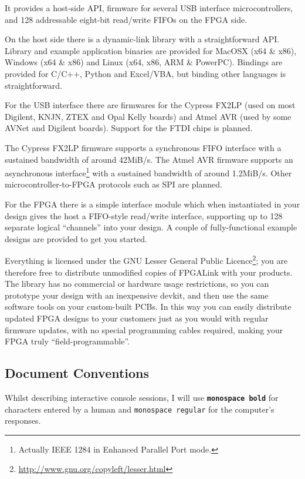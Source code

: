 It provides a host-side API, firmware for several USB interface microcontrollers, and 128 addressable eight-bit read/write FIFOs on the FPGA side.

\begin{blobs}
  \item
    On the host side there is a dynamic-link library with a straightforward API. Library and example application binaries are provided for MacOSX (x64 \& x86), Windows (x64 \& x86) and Linux (x64, x86, ARM \& PowerPC). Bindings are provided for C/C++, Python and Excel/VBA, but binding other languages is straightforward.
  \item
    For the USB interface there are firmwares for the Cypress FX2LP (used on most Digilent, KNJN, ZTEX and Opal Kelly boards) and Atmel AVR (used by some AVNet and Digilent boards). Support for the FTDI chips is planned.
  \item
    The Cypress FX2LP firmware supports a synchronous FIFO interface with a sustained bandwidth of around 42MiB/s. The Atmel AVR firmware supports an asynchronous interface\footnote{Actually IEEE 1284 in Enhanced Parallel Port mode.} with a sustained bandwidth of around 1.2MiB/s. Other microcontroller-to-FPGA protocols such as SPI are planned.
  \item
    For the FPGA there is a simple interface module which when instantiated in your design gives the host a FIFO-style read/write interface, supporting up to 128 separate logical ``channels'' into your design. A couple of fully-functional example designs are provided to get you started.
\end{blobs}

Everything is licensed under the GNU Lesser General Public Licence\footnote{\url{http://www.gnu.org/copyleft/lesser.html}}; you are therefore free to distribute unmodified copies of FPGALink with your products. The library has no commercial or hardware usage restrictions, so you can prototype your design with an inexpensive devkit, and then use the same software tools on your custom-built PCBs. In this way you can easily distribute updated FPGA designs to your customers just as you would with regular firmware updates, with no special programming cables required, making your FPGA truly ``field-programmable''.

\subsection{Document Conventions}
Whilst describing interactive console sessions, I will use {\bf\textcolor[rgb]{0.00,0.00,0.00}{\texttt{monospace bold}}} for characters entered by a human and {\textcolor[rgb]{0.20,0.20,0.20}{\texttt{monospace regular}}} for the computer's responses.

